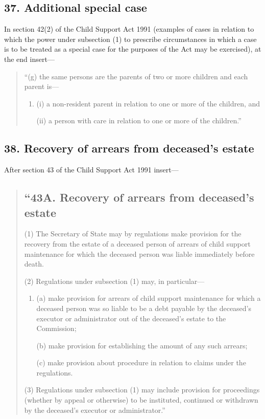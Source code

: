\documentclass[a4paper]{article}
\begin{document}
\subsection{37. Additional special case}

In section 42(2) of the Child Support Act 1991 (examples of cases in relation to which the power under subsection (1) to prescribe circumstances in which a case is to be treated as a special case for the purposes of the Act may be exercised), at the end insert---
\begin{quotation}
``(g) the same persons are the parents of two or more children and each parent is---
\begin{enumerate}\item[]
(i) a non-resident parent in relation to one or more of the children, and

(ii) a person with care in relation to one or more of the children.''
\end{enumerate}
\end{quotation}

\subsection{38. Recovery of arrears from deceased's estate}

After section 43 of the Child Support Act 1991 insert---

\begin{quotation}
\subsection*{``43A. Recovery of arrears from deceased's estate}

(1) The Secretary of State may by regulations make provision for the recovery from the estate of a deceased person of arrears of child support maintenance for which the deceased person was liable immediately before death.

(2) Regulations under subsection (1) may, in particular---
\begin{enumerate}\item[]
(a) make provision for arrears of child support maintenance for which a deceased person was so liable to be a debt payable by the deceased’s executor or administrator out of the deceased’s estate to the Commission;

(b) make provision for establishing the amount of any such arrears;

(c) make provision about procedure in relation to claims under the regulations.
\end{enumerate}

(3) Regulations under subsection (1) may include provision for proceedings (whether by appeal or otherwise) to be instituted, continued or withdrawn by the deceased’s executor or administrator.''
\end{quotation}
\end{document}
